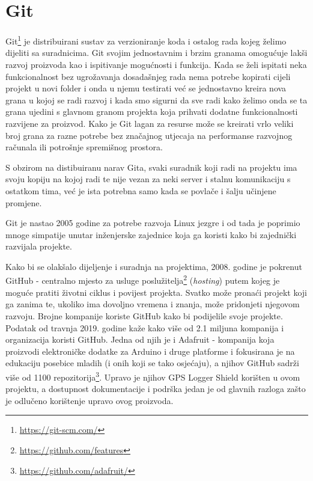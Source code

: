 \section{Git}
Git\footnote{\href{https://git-scm.com/}{https://git-scm.com/}} je distribuirani sustav za verzioniranje koda i ostalog rada kojeg želimo dijeliti sa suradnicima.
Git svojim jednostavnim i brzim granama omogućuje lakši razvoj proizvoda kao i ispitivanje mogućnosti i funkcija.
Kada se želi ispitati neka funkcionalnost bez ugrožavanja dosadašnjeg rada nema potrebe kopirati cijeli projekt u novi folder i onda u njemu testirati već se jednostavno kreira nova grana u kojoj se radi razvoj i kada smo sigurni da sve radi kako želimo onda se ta grana ujedini s glavnom granom projekta koja prihvati dodatne funkcionalnosti razvijene za proizvod.
Kako je Git lagan za resurse može se kreirati vrlo veliki broj grana za razne potrebe bez značajnog utjecaja na performanse razvojnog računala ili potrošnje spremišnog prostora.

S obzirom na distibuiranu narav Gita, svaki suradnik koji radi na projektu ima svoju kopiju na kojoj radi te nije vezan za neki server i stalnu komunikaciju s ostatkom tima, već je ista potrebna samo kada se povlače i šalju učinjene promjene.

Git je nastao 2005 godine za potrebe razvoja Linux jezgre i od tada je poprimio mnoge simpatije unutar inženjerske zajednice koja ga koristi kako bi zajednički razvijala projekte.

Kako bi se olakšalo dijeljenje i suradnja na projektima, 2008. godine je pokrenut GitHub - centralno mjesto za usluge poslužitelja\footnote{\href{https://github.com/features}{https://github.com/features}} (\textit{hosting}) putem kojeg je moguće pratiti životni ciklus i povijest projekta.
Svatko može pronaći projekt koji ga zanima te, ukoliko ima dovoljno vremena i znanja, može pridonjeti njegovom razvoju.
Brojne kompanije koriste GitHub kako bi podijelile svoje projekte. Podatak od travnja 2019. godine kaže kako više od 2.1 miljuna kompanija i organizacija koristi GitHub.
Jedna od njih je i Adafruit - kompanija koja proizvodi elektroničke dodatke za Arduino i druge platforme i fokusirana je na edukaciju posebice mladih (i onih koji se tako osjećaju), a njihov GitHub sadrži više od 1100 repozitorija\footnote{\href{https://github.com/adafruit}{https://github.com/adafruit/}}.
Upravo je njihov GPS Logger Shield korišten u ovom projektu, a dostupnost dokumentacije i podrška jedan je od glavnih razloga zašto je odlučeno korištenje upravo ovog proizvoda.
